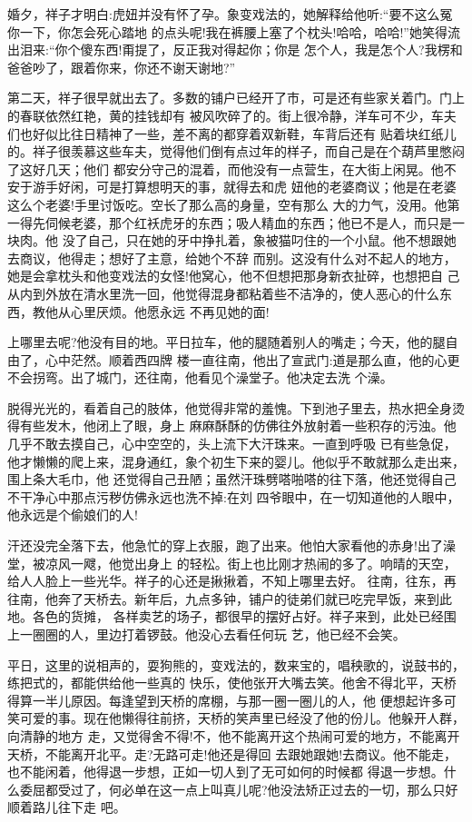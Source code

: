 \documentclass[11pt,a4paper,onecolumn]{article}
\begin{document}
婚夕，祥子才明白:虎妞并没有怀了孕。象变戏法的，她解释给他听:``要不这么冤你一下，你怎会死心踏地
的点头呢!我在裤腰上塞了个枕头!哈哈，哈哈!''她笑得流出泪来:``你个傻东西!甭提了，反正我对得起你；你是
怎个人，我是怎个人?我楞和爸爸吵了，跟着你来，你还不谢天谢地?''

第二天，祥子很早就出去了。多数的铺户已经开了市，可是还有些家关着门。门上的春联依然红艳，黄的挂钱却有
被风吹碎了的。街上很冷静，洋车可不少，车夫们也好似比往日精神了一些，差不离的都穿着双新鞋，车背后还有
贴着块红纸儿的。祥子很羡慕这些车夫，觉得他们倒有点过年的样子，而自己是在个葫芦里憋闷了这好几天；他们
都安分守己的混着，而他没有一点营生，在大街上闲晃。他不安于游手好闲，可是打算想明天的事，就得去和虎
妞\myrule 他的老婆商议；他是在老婆\myrule 这么个老婆!\myrule 手里讨饭吃。空长了那么高的身量，空有那么
大的力气，没用。他第一得先伺候老婆，那个红袄虎牙的东西；吸人精血的东西；他已不是人，而只是一块肉。他
没了自己，只在她的牙中挣扎着，象被猫叼住的一个小鼠。他不想跟她去商议，他得走；想好了主意，给她个不辞
而别。这没有什么对不起人的地方，她是会拿枕头和他变戏法的女怪!他窝心，他不但想把那身新衣扯碎，也想把自
己从内到外放在清水里洗一回，他觉得混身都粘着些不洁净的，使人恶心的什么东西，教他从心里厌烦。他愿永远
不再见她的面!

上哪里去呢?他没有目的地。平日拉车，他的腿随着别人的嘴走；今天，他的腿自由了，心中茫然。顺着西四牌
楼一直往南，他出了宣武门:道是那么直，他的心更不会拐弯。出了城门，还往南，他看见个澡堂子。他决定去洗
个澡。

脱得光光的，看着自己的肢体，他觉得非常的羞愧。下到池子里去，热水把全身烫得有些发木，他闭上了眼，身上
麻麻酥酥的仿佛往外放射着一些积存的污浊。他几乎不敢去摸自己，心中空空的，头上流下大汗珠来。一直到呼吸
已有些急促，他才懒懒的爬上来，混身通红，象个初生下来的婴儿。他似乎不敢就那么走出来，围上条大毛巾，他
还觉得自己丑陋；虽然汗珠劈嗒啪嗒的往下落，他还觉得自己不干净\myrule 心中那点污秽仿佛永远也洗不掉:在刘
四爷眼中，在一切知道他的人眼中，他永远是个偷娘们的人!

汗还没完全落下去，他急忙的穿上衣服，跑了出来。他怕大家看他的赤身!出了澡堂，被凉风一飕，他觉出身上
的轻松。街上也比刚才热闹的多了。响晴的天空，给人人脸上一些光华。祥子的心还是揪揪着，不知上哪里去好。
往南，往东，再往南，他奔了天桥去。新年后，九点多钟，铺户的徒弟们就已吃完早饭，来到此地。各色的货摊，
各样卖艺的场子，都很早的摆好占好。祥子来到，此处已经围上一圈圈的人，里边打着锣鼓。他没心去看任何玩
艺，他已经不会笑。

平日，这里的说相声的，耍狗熊的，变戏法的，数来宝的，唱秧歌的，说鼓书的，练把式的，都能供给他一些真的
快乐，使他张开大嘴去笑。他舍不得北平，天桥得算一半儿原因。每逢望到天桥的席棚，与那一圈一圈儿的人，他
便想起许多可笑可爱的事。现在他懒得往前挤，天桥的笑声里已经没了他的份儿。他躲开人群，向清静的地方
走，又觉得舍不得!不，他不能离开这个热闹可爱的地方，不能离开天桥，不能离开北平。走?无路可走!他还是得回
去跟她\myrule 跟她!\myrule 去商议。他不能走，也不能闲着，他得退一步想，正如一切人到了无可如何的时候都
得退一步想。什么委屈都受过了，何必单在这一点上叫真儿呢?他没法矫正过去的一切，那么只好顺着路儿往下走
吧。
\end{document}
